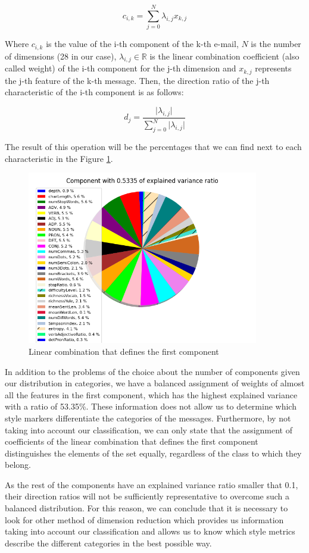 $$
c_{i, k} = \sum_{j = 0}^N\lambda_{i, j}x_{k, j}
$$

Where $c_{i, k}$ is the value of the i-th component of the k-th e-mail, $N$ is the number of dimensions (28 in our case), $\lambda_{i, j}\in\mathds{R}$ is the linear combination coefficient (also called weight) of the i-th component for the j-th dimension and $x_{k, j}$ represents the j-th feature of the k-th message. Then, the direction ratio of the j-th characteristic of the i-th component is as follows:

$$
d_j = \frac{\lvert\lambda_{i,j}\rvert}{\sum_{j = 0}^N\lvert\lambda_{i, j}\rvert}
$$

The result of this operation will be the percentages that we can find next to each characteristic in the Figure \ref{fig:comp0pie}.

\begin{figure}
	\centering%
	\centerline{\includegraphics[width=0.9\textwidth]{Imagenes/Bitmap/PCA/comp0pie.png}}%
	\caption{Linear combination that defines the first component}%
	\label{fig:comp0pie}
\end{figure}

In addition to the problems of the choice about the number of components given our distribution in categories, we have a balanced assignment of weights of almost all the features in the first component, which has the highest explained variance with a ratio of 53.35\%. These information does not allow us to determine which style markers differentiate the categories of the messages. Furthermore, by not taking into account our classification, we can only state that the assignment of coefficients of the linear combination that defines the first component distinguishes the elements of the set equally, regardless of the class to which they belong.

As the rest of the components have an explained variance ratio smaller that 0.1, their direction ratios will not be sufficiently representative to overcome such a balanced distribution. For this reason, we can conclude that it is necessary to look for other method of dimension reduction which provides us information taking into account our classification and allows us to know which style metrics describe the different categories in the best possible way.